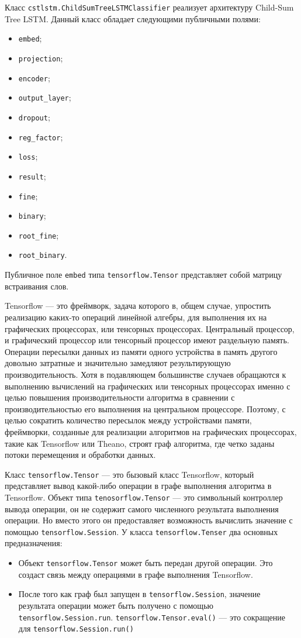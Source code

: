 Класс \texttt{cstlstm.ChildSumTreeLSTMClassifier} реализует архитектуру Child-Sum Tree LSTM\@. Данный класс обладает следующими публичными полями:
\begin{itemize}
\item \texttt{embed};
\item \texttt{projection};
\item \texttt{encoder};
\item \texttt{output\_layer};
\item \texttt{dropout};
\item \texttt{reg\_factor};
\item \texttt{loss};
\item \texttt{result};
\item \texttt{fine};
\item \texttt{binary};
\item \texttt{root\_fine};
\item \texttt{root\_binary}.
\end{itemize}

Публичное поле \texttt{embed} типа \texttt{tensorflow.Tensor} представляет собой матрицу встраивания слов.

Tensorflow --- это фреймворк, задача которого в, общем случае, упростить реализацию каких-то операций линейной алгебры, для выполнения их на графических процессорах, или тенсорных процессорах. Центральный процессор, и графический процессор или тенсорный процессор имеют раздельную память. Операции пересылки данных из памяти одного устройства в память другого довольно затратные и значительно замедляют результирующую производительность. Хотя в подавляющем большинстве случаев обращаются к выполнению вычислений на графических или тенсорных процессорах именно с целью повышения производительности алгоритма в сравнении с производительностью его выполнения на центральном процессоре. Поэтому, с целью сократить количество пересылок между устройствами памяти, фреймворки, созданные для реализации алгоритмов на графических процессорах, такие как Tensorflow или Theano, строят граф алгоритма, где четко заданы потоки перемещения и обработки данных.

Класс \texttt{tensorflow.Tensor} --- это бызовый класс Tensorflow, который представляет вывод какой-либо операции в графе выполнения алгоритма в Tensorflow. Объект типа \texttt{tenosorflow.Tensor} --- это символьный контроллер вывода операции, он не содержит самого численного результата выполнения операции. Но вместо этого он предоставляет возможность вычислить значение с помощью \texttt{tensorflow.Session}. У класса \texttt{tensorflow.Tenser} два основных предназначения:
\begin{itemize}
\item Объект \texttt{tensorflow.Tensor} может быть передан другой операции. Это создаст связь между операциями в графе выполнения Tensorflow.
\item После того как граф был запущен в \texttt{tensorflow.Session}, значение результата операции может быть получено с помощью \texttt{tensorflow.Sessi\-on.run}. \texttt{tensorflow.Tensor.eval()} --- это сокращение для \texttt{tensorflow.Ses\-sion.run()}
\end{itemize}

